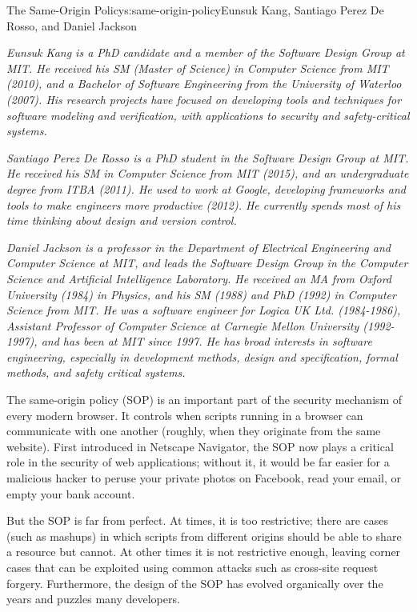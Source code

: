 \begin{aosachapter}{The Same-Origin Policy}{s:same-origin-policy}{Eunsuk Kang, Santiago Perez De Rosso, and Daniel Jackson}

\emph{Eunsuk Kang is a PhD candidate and a member of the Software Design
Group at MIT. He received his SM (Master of Science) in Computer Science
from MIT (2010), and a Bachelor of Software Engineering from the
University of Waterloo (2007). His research projects have focused on
developing tools and techniques for software modeling and verification,
with applications to security and safety-critical systems.}

\emph{Santiago Perez De Rosso is a PhD student in the Software Design
Group at MIT. He received his SM in Computer Science from MIT (2015),
and an undergraduate degree from ITBA (2011). He used to work at Google,
developing frameworks and tools to make engineers more productive
(2012). He currently spends most of his time thinking about design and
version control.}

\emph{Daniel Jackson is a professor in the Department of Electrical
Engineering and Computer Science at MIT, and leads the Software Design
Group in the Computer Science and Artificial Intelligence Laboratory. He
received an MA from Oxford University (1984) in Physics, and his SM
(1988) and PhD (1992) in Computer Science from MIT. He was a software
engineer for Logica UK Ltd. (1984-1986), Assistant Professor of Computer
Science at Carnegie Mellon University (1992-1997), and has been at MIT
since 1997. He has broad interests in software engineering, especially
in development methods, design and specification, formal methods, and
safety critical systems.}

\label{introduction}

The same-origin policy (SOP) is an important part of the security
mechanism of every modern browser. It controls when scripts running in a
browser can communicate with one another (roughly, when they originate
from the same website). First introduced in Netscape Navigator, the SOP
now plays a critical role in the security of web applications; without
it, it would be far easier for a malicious hacker to peruse your private
photos on Facebook, read your email, or empty your bank account.

But the SOP is far from perfect. At times, it is too restrictive; there
are cases (such as mashups) in which scripts from different origins
should be able to share a resource but cannot. At other times it is not
restrictive enough, leaving corner cases that can be exploited using
common attacks such as cross-site request forgery. Furthermore, the
design of the SOP has evolved organically over the years and puzzles
many developers.


\end{aosachapter}
